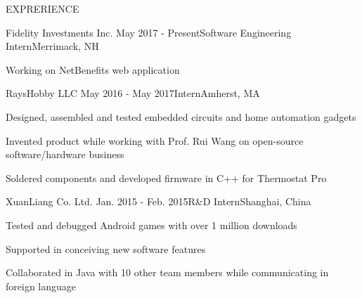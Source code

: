 \documentclass{resume} %
\begin{document}
	\begin{rSection}{EXPRERIENCE}
			
		\begin{rSubsection}{Fidelity Investments Inc.} {May 2017 - Present}{Software Engineering Intern}{Merrimack, NH}
			\item Working on NetBenefits web application
		\end{rSubsection}
	
		\begin{rSubsection}{RaysHobby LLC} {May 2016 - May 2017}{Intern}{Amherst, MA}
			\item Designed, assembled and tested embedded circuits and home automation gadgets
			\item Invented product while working with Prof. Rui Wang on open-source software/hardware business
			\item Soldered components and developed firmware in C++ for Thermostat Pro
		\end{rSubsection}
	
		\begin{rSubsection}{XuanLiang Co. Ltd.} {Jan. 2015 - Feb. 2015}{R\&D  Intern}{Shanghai, China}
			\item Tested and debugged Android games with over 1 million downloads
			\item Supported in conceiving new software features
			\item Collaborated in Java with 10 other team members while communicating in foreign language
		\end{rSubsection}
	
	\end{rSection}
	
	
\end{document}
